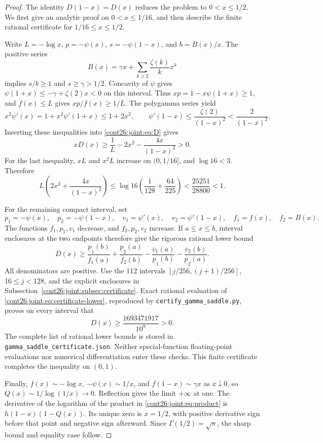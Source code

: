 \documentclass[11pt,letterpaper]{article}
\numberwithin{equation}{section}
\theoremstyle{plain}
\theoremstyle{definition}
\theoremstyle{remark}
\begin{document}
\begin{proof}
The identity $D(1-x)=D(x)$ reduces the problem to $0<x\le1/2$.
We first give an analytic proof on $0<x\le1/16$, and then describe the
finite rational certificate for $1/16\le x\le1/2$.

Write $L=-\log x$, $p=-\psi(x)$, $s=-\psi(1-x)$, and
$b=B(x)/x$.  The positive series
\[
 B(x)=\gamma x+\sum_{k\ge2}\frac{\zeta(k)}k x^k
\]
implies $s/b\ge1$ and $s\ge\gamma>1/2$.
Concavity of $\psi$ gives
$\psi(1+x)\le-\gamma+\zeta(2)x<0$ on this interval.
Thus $xp=1-x\psi(1+x)\ge1$, and $f(x)\le L$ gives
$xp/f(x)\ge1/L$.  The polygamma series yield
\[
 x^2\psi'(x)=1+x^2\psi'(1+x)\le1+2x^2,
 \qquad \psi'(1-x)\le\frac{\zeta(2)}{(1-x)^2}
 <\frac2{(1-x)^2}.
\]
Inserting these inequalities into \eqref{cont26:joint:eq:D} gives
\begin{equation}\label{cont26:joint:eq:endpoint-D}
 xD(x)\ge\frac1L-2x^2-\frac{4x}{(1-x)^2}>0.
\end{equation}
For the last inequality, $xL$ and $x^2L$ increase on $(0,1/16]$,
and $\log16<3$.  Therefore
\[
 L\left(2x^2+\frac{4x}{(1-x)^2}\right)
 \le\log16\left(\frac1{128}+\frac{64}{225}\right)
 <\frac{25251}{28800}<1.
\]

For the remaining compact interval, set
\[
 p_1=-\psi(x),\quad p_2=-\psi(1-x),\quad
 v_1=\psi'(x),\quad v_2=\psi'(1-x),\quad f_1=f(x),\quad f_2=B(x).
\]
The functions $f_1,p_1,v_1$ decrease, and $f_2,p_2,v_2$ increase.
If $a\le x\le b$, interval enclosures at the two endpoints therefore give
the rigorous rational lower bound
\begin{equation}\label{cont26:joint:eq:certificate-lower}
 D(x)\ge
 \frac{\underline p_1(b)}{\overline f_1(a)}
 +\frac{\underline p_2(a)}{\overline f_2(b)}
 -\frac{\overline v_1(a)}{\underline p_1(b)}
 -\frac{\overline v_2(b)}{\underline p_2(a)}.
\end{equation}
All denominators are positive.  Use the 112 intervals
$[j/256,(j+1)/256]$, $16\le j<128$, and the explicit enclosures in
Subsection~\ref{cont26:joint:subsec:certificate}.  Exact rational evaluation of
\eqref{cont26:joint:eq:certificate-lower}, reproduced by
\texttt{certify\_gamma\_saddle.py}, proves on every interval that
\begin{equation}\label{cont26:joint:eq:certificate-margin}
 D(x)\ge \frac{1693471917}{10^9}>0.
\end{equation}
The complete list of rational lower bounds is stored in
\texttt{gamma\_saddle\_certificate.json}.  Neither special-function
floating-point evaluations nor numerical differentiation enter these
checks.  This finite certificate completes the inequality on $(0,1)$.

Finally, $f(x)\sim-\log x$, $-\psi(x)\sim1/x$, and
$f(1-x)\sim\gamma x$ as $x\downarrow0$, so
$Q(x)\sim1/\log(1/x)\to0$.  Reflection gives the limit $+\infty$ at
one.  The derivative of the logarithm of the product in
\eqref{cont26:joint:eq:product} is $h(1-x)(1-Q(x))$.
Its unique zero is $x=1/2$, with positive derivative sign before that
point and negative sign afterward.  Since $\Gamma(1/2)=\sqrt\pi$,
the sharp bound and equality case follow.
\end{proof}
\end{document}
